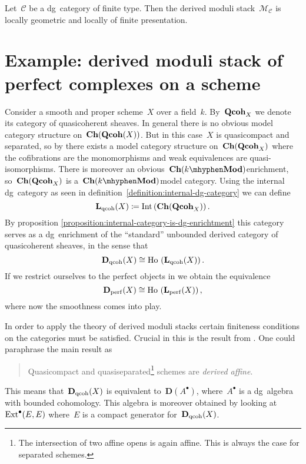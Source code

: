 \begin{refsection}
\begin{theorem}
  \label{theorem:main-theorem}
  Let~$\mathcal{C}$ be a dg~category of finite type. Then the derived moduli stack~$\mathcal{M}_{\mathcal{C}}$ is locally geometric and locally of finite presentation.
\end{theorem}

\section{Example: derived moduli stack of perfect complexes on a scheme}
\label{section:example}
Consider a smooth and proper scheme~$X$ over a field~$k$. By~$\mathbf{Qcoh}_X$ we denote its category of quasicoherent sheaves. In general there is no obvious model category structure on~$\mathbf{Ch}(\mathbf{Qcoh}(X))$. But in this case~$X$ is quasicompact and separated, so by \cite{hovey-sheaves} there exists a model category structure on~$\mathbf{Ch}(\mathbf{Qcoh}_X)$ where the cofibrations are the monomorphisms and weak equivalences are quasi-isomorphisms. There is moreover an obvious~$\Ch(k\mhyphen\Mod)$\dash enrichment, so~$\mathbf{Ch}(\mathbf{Qcoh}_X)$ is a~$\Ch(k\mhyphen\Mod)$\dash model category. Using the internal dg~category as seen in definition~\ref{definition:internal-dg-category} we can define
\begin{equation}
  \mathbf{L}_{\mathrm{qcoh}}(X)\coloneqq\operatorname{Int}\left( \mathbf{Ch}(\mathbf{Qcoh}_X) \right).
\end{equation}
By proposition \ref{proposition:internal-category-is-dg-enrichtment} this category serves as a dg~enrichment of the ``standard'' unbounded derived category of quasicoherent sheaves, in the sense that
\begin{equation}
  \mathbf{D}_{\mathrm{qcoh}}(X)\cong\operatorname{\mathrm{Ho} \,}\left( \mathbf{L}_{\mathrm{qcoh}}(X) \right).
\end{equation}
If we restrict ourselves to the perfect objects in we obtain the equivalence
\begin{equation}
  \mathbf{D}_{\mathrm{perf}}(X)\cong\operatorname{\mathrm{Ho} \,}\left( \mathbf{L}_{\mathrm{perf}}(X) \right),
\end{equation}
where now the smoothness comes into play.

In order to apply the theory of derived moduli stacks certain finiteness conditions on the categories must be satisfied. Crucial in this is the result from \cite{bondal-vandenbergh}. One could paraphrase the main result as
\begin{quote}
  Quasicompact and quasiseparated\footnote{The intersection of two affine opens is again affine. This is always the case for separated schemes.} schemes are \emph{derived affine}.
\end{quote}
\begin{flushright}
  \cite[corollary 3.1.8]{bondal-vandenbergh}
\end{flushright}
This means that~$\mathbf{D}_{\mathrm{qcoh}}(X)$ is equivalent to~$\mathbf{D}(A^\bullet)$, where~$A^\bullet$ is a dg~algebra with bounded cohomology. This algebra is moreover obtained by looking at~$\mathrm{Ext}^\bullet(E,E)$ where~$E$ is a compact generator for~$\mathbf{D}_{\mathrm{qcoh}}(X)$.


\end{refsection}
